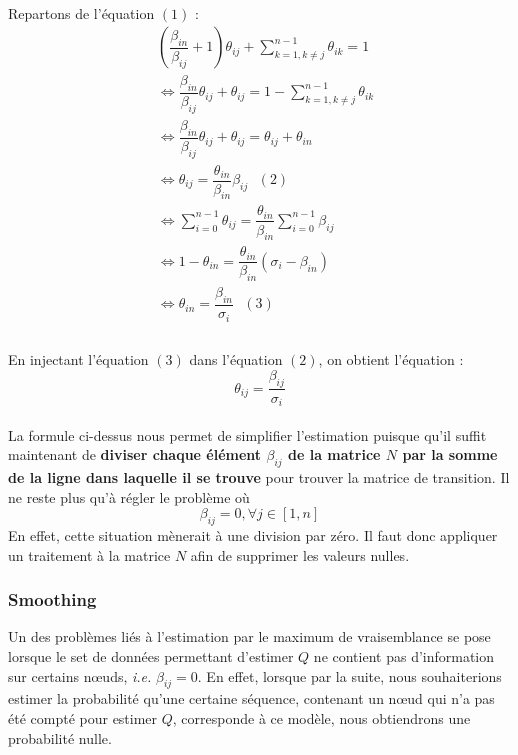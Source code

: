 \documentclass[a4paper,titlepage]{report}
\begin{document}
\paragraph{}
Repartons de l'équation $(1)$ : 
\[
\begin{aligned}
	&\left(\dfrac{\beta_{in}}{\beta_{ij}} + 1\right) \theta_{ij} + \sum\limits_{k = 1, k \neq j}^{n - 1} \theta_{ik} = 1\\
	&\Leftrightarrow \dfrac{\beta_{in}}{\beta_{ij}} \theta_{ij} + \theta_{ij} = 1 - \sum\limits_{k = 1, k \neq j}^{n - 1} \theta_{ik}\\
	&\Leftrightarrow \dfrac{\beta_{in}}{\beta_{ij}} \theta_{ij} + \theta_{ij} = \theta_{ij} + \theta_{in}\\
	&\Leftrightarrow \theta_{ij}= \dfrac{\theta_{in}}{\beta_{in}} \beta_{ij}\text{ }(2)\\
	&\Leftrightarrow \sum\limits_{i = 0}^{n - 1} \theta_{ij} = \dfrac{\theta_{in}}{\beta_{in}} \sum\limits_{i = 0}^{n - 1}\beta_{ij}\\
	&\Leftrightarrow 1 - \theta_{in} = \dfrac{\theta_{in}}{\beta_{in}} \left(\sigma_i - \beta_{in}\right)\\	
	&\Leftrightarrow \theta_{in} = \dfrac{\beta_{in}}{\sigma_{i}} \text{ }(3)\\	
\end{aligned}
\]
\paragraph{}
En injectant l'équation $(3)$ dans l'équation $(2)$, on obtient l'équation :
\[
\theta_{ij} = \dfrac{\beta_{ij}}{\sigma_{i}}
\]
\paragraph{}
La formule ci-dessus nous permet de simplifier l'estimation puisque qu'il suffit maintenant de \textbf{diviser chaque élément $\beta_{ij}
$ de la matrice $N$ par la somme de la ligne dans laquelle il se trouve} pour trouver la matrice de transition. Il ne reste plus qu'à régler le problème où
\[
\beta_{ij} = 0, \forall j \in [1,n]
\]
En effet, cette situation mènerait à une division par zéro. Il faut donc appliquer un traitement à la matrice $N$ afin de supprimer les valeurs nulles.

\subsubsection{Smoothing}
Un des problèmes liés à l'estimation par le maximum de vraisemblance se pose lorsque le set de données permettant d'estimer $Q$ ne contient pas d'information sur certains nœuds, \textit{i.e.} $\beta_{ij} = 0$. En effet, lorsque par la suite, nous souhaiterions estimer la probabilité qu'une certaine séquence, contenant un nœud qui n'a pas été compté pour estimer $Q$, corresponde à ce modèle, nous obtiendrons une probabilité nulle.
\end{document}

